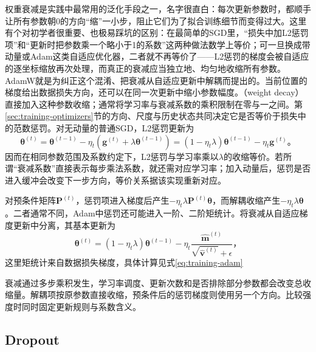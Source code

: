 权重衰减是实践中最常用的泛化手段之一，名字很直白：每次更新参数时，都顺手让所有参数朝0的方向“缩”一小步，阻止它们为了拟合训练细节而变得过大。这里有个对初学者很重要、也极易踩坑的区别：在最简单的SGD里，“损失中加L2惩罚项”和“更新时把参数乘一个略小于1的系数”这两种做法数学上等价；可一旦换成带动量或Adam这类自适应优化器，二者就不再等价了——L2惩罚的梯度会被自适应的逐坐标缩放再次处理，而真正的衰减应当独立地、均匀地收缩所有参数。AdamW就是为纠正这个混淆、把衰减从自适应更新中解耦而提出的。当前位置的梯度给出数据损失方向，还可以在同一次更新中缩小参数幅度。（weight decay）直接加入这种参数收缩；通常将学习率与衰减系数的乘积限制在零与一之间。第\ref{sec:training-optimizers}节的方向、尺度与历史状态共同决定它是否等价于损失中的范数惩罚。对无动量的普通SGD，L2惩罚更新为
\begin{equation}
  \bm\theta^{(t)}=\bm\theta^{(t-1)}-
    \eta_t(\bm g^{(t)}+\lambda\bm\theta^{(t-1)})
  =(1-\eta_t\lambda)\bm\theta^{(t-1)}-\eta_t\bm g^{(t)}\text{。}
  \label{eq:generalization-sgd-weight-decay}
\end{equation}
因而在相同参数范围及系数约定下，L2惩罚与学习率乘以$\lambda$的收缩等价。若所谓“衰减系数”直接表示每步乘法系数，就还需对应学习率；加入动量后，惩罚是否进入缓冲会改变下一步方向，等价关系据该实现重新对应。

对预条件矩阵$\bm P^{(t)}$，惩罚项进入梯度后产生$-\eta_t\lambda\bm P^{(t)}\bm\theta$，而解耦收缩产生$-\eta_t\lambda\bm\theta$。二者通常不同，Adam中惩罚还可能进入一阶、二阶矩统计。将衰减从自适应梯度更新中分离，其基本更新为
\begin{equation}
  \bm\theta^{(t)}=(1-\eta_t\lambda)\bm\theta^{(t-1)}-
    \eta_t\frac{\hat{\bm m}^{(t)}}{\sqrt{\hat{\bm v}^{(t)}}+\epsilon}\text{，}
  \label{eq:generalization-adamw}
\end{equation}
这里矩统计来自数据损失梯度，具体计算见式\eqref{eq:training-adam}

衰减通过多步乘积发生，学习率调度、更新次数和是否排除部分参数都会改变总收缩量。解耦项按原参数直接收缩，预条件后的惩罚梯度则使用另一个方向。比较强度时同时固定更新规则与系数含义。

\subsection{Dropout}
\label{sec:generalization-dropout}
\label{sec:generalization-stochastic-regularization}

